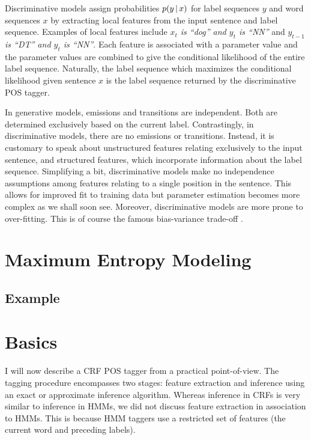 Discriminative models assign probabilities $p(y\mbox{$ \, | \, $} x)$ for label
sequences $y$ and word sequences $x$ by extracting local features from
the input sentence and label sequence. Examples of local features
include {\it $x_t$ is ``dog'' and $y_t$ is ``NN''} and {\it $y_{t-1}$ is ``DT'' and
  $y_t$ is ``NN''}. Each feature is associated with a parameter value and the
parameter values are combined to give the conditional likelihood of
the entire label sequence. Naturally, the label sequence which
maximizes the conditional likelihood given sentence $x$ is the label
sequence returned by the discriminative POS tagger.

In generative models, emissions and transitions are independent. Both
are determined exclusively based on the current label. Contrastingly,
in discriminative models, there are no emissions or
transitions. Instead, it is customary to speak about unstructured
features relating exclusively to the input sentence, and structured
features, which incorporate information about the label
sequence. Simplifying a bit, discriminative models make no
independence assumptions among features relating to a single position
in the sentence. This allows for improved fit to training data but
parameter estimation becomes more complex as we shall soon
see. Moreover, discriminative models are more prone to
over-fitting. This is of course the famous bias-variance trade-off
\citep{Geman1992}.


\section{Maximum Entropy Modeling}
\label{sec:me}

\subsection{Example}
\label{sec:maxent-ex}

\section{Basics}
\label{crf:basics}

I will now describe a CRF POS tagger from a practical
point-of-view. The tagging procedure encompasses two stages: feature
extraction and inference using an exact or approximate inference
algorithm. Whereas inference in CRFs is very similar to inference in
HMMs, we did not discuss feature extraction in association to
HMMs. This is because HMM taggers use a restricted set of features
(the current word and preceding labels).

